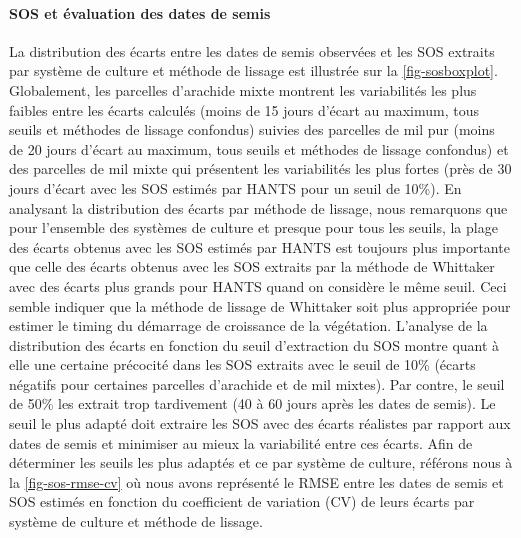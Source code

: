 \paragraph{SOS et évaluation des dates de semis}
La distribution des écarts entre les dates de semis observées et les SOS extraits par système de culture et méthode de lissage est illustrée sur la \cref{fig-sosboxplot}. Globalement, les parcelles d’arachide mixte montrent les variabilités les plus faibles entre les écarts calculés (moins de 15 jours d’écart au maximum, tous seuils et méthodes de lissage confondus) suivies des parcelles de mil pur (moins de 20 jours d’écart au maximum, tous seuils et méthodes de lissage
confondus) et des parcelles de mil mixte qui présentent les variabilités les plus fortes (près de 30 jours d’écart avec les SOS estimés par HANTS pour un seuil de 10\%). En analysant la distribution des écarts par méthode de lissage, nous remarquons que pour l’ensemble des systèmes de culture et presque pour tous les seuils, la plage des
écarts obtenus avec les SOS estimés par HANTS est toujours plus importante que celle des écarts obtenus avec les SOS extraits par la méthode de Whittaker avec des écarts plus grands pour HANTS quand on considère le même seuil. Ceci semble indiquer que la méthode de lissage de Whittaker soit plus appropriée pour estimer le timing du démarrage de croissance de la végétation. L’analyse de la distribution des écarts
en fonction du seuil d’extraction du SOS montre quant à elle une certaine précocité dans les SOS extraits avec le seuil de 10\% (écarts négatifs pour certaines parcelles d’arachide et de mil mixtes). Par contre, le seuil de 50\% les extrait trop tardivement (40 à 60 jours après les dates de semis). Le seuil le plus adapté doit extraire les SOS avec des écarts réalistes par rapport aux dates de semis et minimiser au mieux la variabilité entre ces écarts. Afin de déterminer les seuils les plus adaptés et ce par système de culture, référons nous à la \cref{fig-sos-rmse-cv} où nous avons représenté le RMSE entre les dates de semis et SOS estimés en fonction du coefficient de variation (CV) de leurs écarts par système de culture et méthode de lissage.

